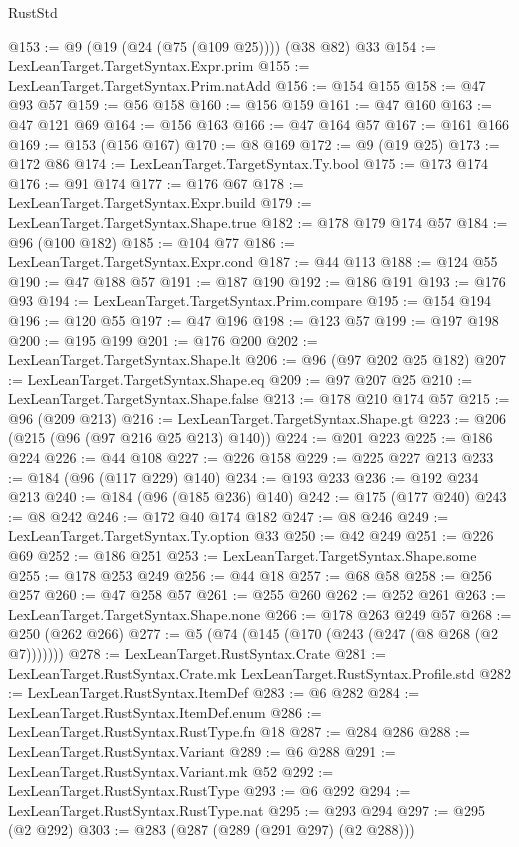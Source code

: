 \begin{lexlean}{RustStd}
\begin{coremodule}
@153 := @9 (@19 (@24 (@75 (@109 @25)))) (@38 @82) @33
@154 := LexLeanTarget.TargetSyntax.Expr.prim
@155 := LexLeanTarget.TargetSyntax.Prim.natAdd
@156 := @154 @155
@158 := @47 @93 @57
@159 := @56 @158
@160 := @156 @159
@161 := @47 @160
@163 := @47 @121 @69
@164 := @156 @163
@166 := @47 @164 @57
@167 := @161 @166
@169 := @153 (@156 @167)
@170 := @8 @169
@172 := @9 (@19 @25)
@173 := @172 @86
@174 := LexLeanTarget.TargetSyntax.Ty.bool
@175 := @173 @174
@176 := @91 @174
@177 := @176 @67
@178 := LexLeanTarget.TargetSyntax.Expr.build
@179 := LexLeanTarget.TargetSyntax.Shape.true
@182 := @178 @179 @174 @57
@184 := @96 (@100 @182)
@185 := @104 @77
@186 := LexLeanTarget.TargetSyntax.Expr.cond
@187 := @44 @113
@188 := @124 @55
@190 := @47 @188 @57
@191 := @187 @190
@192 := @186 @191
@193 := @176 @93
@194 := LexLeanTarget.TargetSyntax.Prim.compare
@195 := @154 @194
@196 := @120 @55
@197 := @47 @196
@198 := @123 @57
@199 := @197 @198
@200 := @195 @199
@201 := @176 @200
@202 := LexLeanTarget.TargetSyntax.Shape.lt
@206 := @96 (@97 @202 @25 @182)
@207 := LexLeanTarget.TargetSyntax.Shape.eq
@209 := @97 @207 @25
@210 := LexLeanTarget.TargetSyntax.Shape.false
@213 := @178 @210 @174 @57
@215 := @96 (@209 @213)
@216 := LexLeanTarget.TargetSyntax.Shape.gt
@223 := @206 (@215 (@96 (@97 @216 @25 @213) @140))
@224 := @201 @223
@225 := @186 @224
@226 := @44 @108
@227 := @226 @158
@229 := @225 @227 @213
@233 := @184 (@96 (@117 @229) @140)
@234 := @193 @233
@236 := @192 @234 @213
@240 := @184 (@96 (@185 @236) @140)
@242 := @175 (@177 @240)
@243 := @8 @242
@246 := @172 @40 @174 @182
@247 := @8 @246
@249 := LexLeanTarget.TargetSyntax.Ty.option @33
@250 := @42 @249
@251 := @226 @69
@252 := @186 @251
@253 := LexLeanTarget.TargetSyntax.Shape.some
@255 := @178 @253 @249
@256 := @44 @18
@257 := @68 @58
@258 := @256 @257
@260 := @47 @258 @57
@261 := @255 @260
@262 := @252 @261
@263 := LexLeanTarget.TargetSyntax.Shape.none
@266 := @178 @263 @249 @57
@268 := @250 (@262 @266)
@277 := @5 (@74 (@145 (@170 (@243 (@247 (@8 @268 (@2 @7)))))))
@278 := LexLeanTarget.RustSyntax.Crate
@281 := LexLeanTarget.RustSyntax.Crate.mk LexLeanTarget.RustSyntax.Profile.std
@282 := LexLeanTarget.RustSyntax.ItemDef
@283 := @6 @282
@284 := LexLeanTarget.RustSyntax.ItemDef.enum
@286 := LexLeanTarget.RustSyntax.RustType.fn @18
@287 := @284 @286
@288 := LexLeanTarget.RustSyntax.Variant
@289 := @6 @288
@291 := LexLeanTarget.RustSyntax.Variant.mk @52
@292 := LexLeanTarget.RustSyntax.RustType
@293 := @6 @292
@294 := LexLeanTarget.RustSyntax.RustType.nat
@295 := @293 @294
@297 := @295 (@2 @292)
@303 := @283 (@287 (@289 (@291 @297) (@2 @288)))

\end{coremodule}
\end{lexlean}
